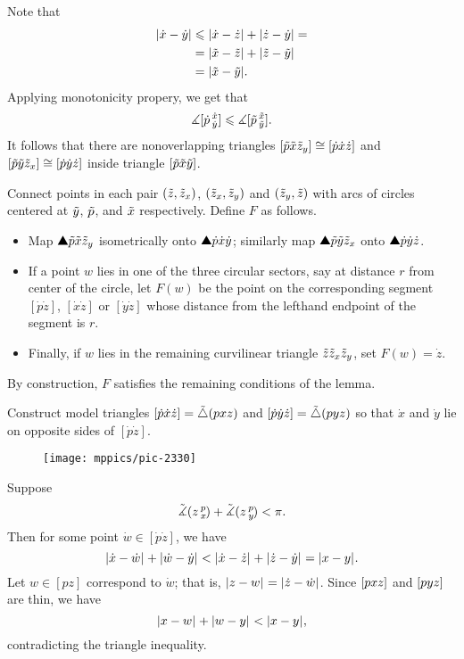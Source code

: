 Note that 
\begin{align*}
|\dot x-\dot y|&\le |\dot x-\dot z|+|\dot z-\dot y|=
\\
&=|\~ x-\~ z|+|\~ z-\~ y|
\\
&=|\~ x-\~ y|.
\end{align*}
Applying monotonicity propery, we get that
\[\measuredangle\hinge{\dot p}{\dot x}{\dot y}\le \measuredangle\hinge{\~ p}{\~ x}{\~ y}.\]
It follows that there are nonoverlapping triangles 
$\trig{\~p}{\~x}{\~z_y}\cong\trig {\dot p}{\dot x}{\dot z}$ 
and 
$\trig{\~p}{\~y}{\~z_x}\cong\trig {\dot p}{\dot y}{\dot z}$
 inside triangle $\trig{\~p}{\~x}{\~y}$.


Connect points in each pair
$(\~z,\~z_x)$, 
$(\~z_x,\~z_y)$ 
and $(\~z_y,\~z)$ 
with arcs of circles centered at 
$\~y$, $\~p$, and $\~x$ respectively. 
Define $F$ as follows.
\begin{itemize}
\item Map  $\solidtriangle{\~p}{\~x}{\~z_y}$ isometrically onto  $\solidtriangle {\dot p}{\dot x}{\dot y}$;
similarly map $\solidtriangle{\~p}{\~y}{\~z_x}$ onto $\solidtriangle {\dot p}{\dot y}{\dot z}$.
\item If a point $w$ lies in one of the three circular sectors, say at distance $r$ from center of the circle, let $F(w)$ be the point on the corresponding segment 
$[\dot p \dot z]$, 
$[\dot x \dot z]$ 
or $[\dot y \dot z]$ whose distance from the lefthand endpoint of the segment is $r$.
\item Finally, if $w$ lies in the remaining curvilinear triangle $\~z \~z_x \~z_y$, 
set $F(w) =\dot z$. 
\end{itemize}
By construction, $F$ satisfies the remaining conditions of the lemma. 
\qeds


Construct model triangles $\trig{\dot p}{\dot x}{\dot z}\z=\modtrig(p x z)$ 
and $\trig {\dot p} {\dot y} {\dot z}=\modtrig(p y z)$ so that $\dot x$ and $\dot y$ lie on opposite sides of $[\dot p\dot z]$.

\begin{wrapfigure}{r}{30 mm}
\vskip-0mm
\centering
\texttt{[image: mppics/pic-2330]}
\end{wrapfigure}

Suppose
\[\angk{z}{p}{x}+\angk{z}{p}{y}
<
\pi.\]
Then for some point $\dot w\in[\dot p\dot z]$, we have \[\dist{\dot x}{\dot w}{}+\dist{\dot w}{\dot y}{}
<
\dist{\dot x}{\dot z}{}+\dist{\dot z}{\dot y}{}=\dist{x}{y}{}.\]
Let $w\in[p z]$ correspond to $\dot w$; that is, $\dist{z}{w}{}=\dist{\dot z}{\dot w}{}$. 
Since $\trig p x z$ and $\trig p y z$ are thin, we have 
\[\dist{x}{w}{}+\dist{w}{y}{}<\dist{x}{y}{},\]
contradicting the triangle inequality. 

